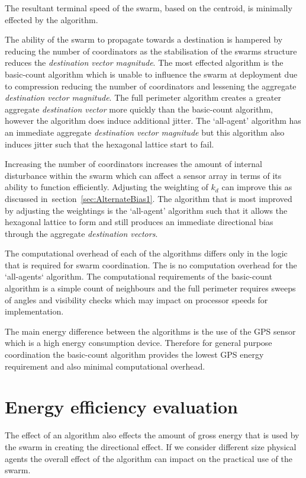 The resultant terminal speed of the swarm, based on the centroid, is minimally effected by the algorithm. 

The ability of the swarm to propagate towards a destination is hampered by reducing the number of coordinators as the stabilisation of the swarms structure reduces the \textit{destination vector magnitude}. The most effected algorithm is the basic-count algorithm which is unable to influence the swarm at deployment due to compression reducing the number of coordinators and lessening the aggregate \textit{destination vector magnitude}. The full perimeter algorithm creates a greater aggregate \textit{destination vector} more quickly than the basic-count algorithm, however the algorithm does induce additional jitter. The `all-agent' algorithm has an immediate aggregate \textit{destination vector magnitude} but this algorithm also induces jitter such that the hexagonal lattice start to fail.
 
Increasing the number of coordinators increases the amount of internal disturbance within the swarm which can affect a sensor array in terms of its ability to function efficiently. Adjusting the weighting of $k_d$ can improve this as discussed in~section~\ref{sec:AlternateBias1}. The algorithm that is most improved by adjusting the weightings is the `all-agent' algorithm such that it allows the hexagonal lattice to form and still produces an immediate directional bias through the aggregate \textit{destination vectors}.  

The computational overhead of each of the algorithms differs only in the logic that is required for swarm coordination. The is no computation overhead for the `all-agents` algorithm. The computational requirements of the basic-count algorithm is a simple count of neighbours and the full perimeter requires sweeps of angles and visibility checks which may impact on processor speeds for implementation. 

The main energy difference between the algorithms is the use of the GPS sensor which is a high energy consumption device. Therefore for general purpose coordination the basic-count algorithm provides the lowest GPS energy requirement and also minimal computational overhead.

\section{Energy efficiency evaluation\label{reduced:EnergyReductionGPS}}
The effect of an algorithm also effects the amount of gross energy that is used by the swarm in creating the directional effect. If we consider different size physical agents the overall effect of the algorithm can impact on the practical use of the swarm.

